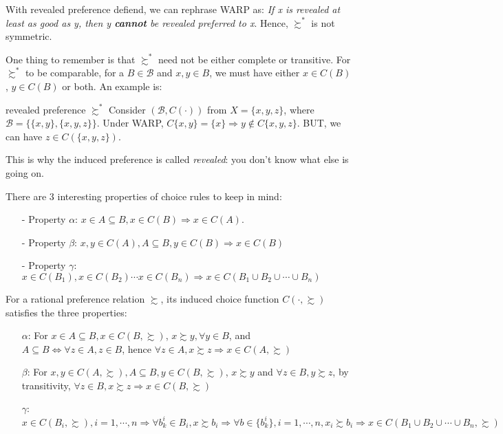 With revealed preference defiend, we can rephrase WARP as: \textit{If x is revealed at least as good as y, then y \textbf{cannot} be revealed preferred to x}. Hence, $\succsim^*$ is not symmetric.

One thing to remember is that $\succsim^*$ need not be either complete or transitive. For $\succsim^*$ to be comparable, for a $B\in\mathcal{B}$ and $x,y\in B$, we must have either $x\in C(B)$, $y\in C(B)$ or both. An example is:
\begin{example}{revealed preference $\succsim^*$}
    Consider $(\mathcal{B},C(\cdot))$ from $X=\{x,y,z\}$, where $\mathcal{B}=\{\{x,y\},\{x,y,z\}\}$. Under WARP, $C\{x,y\}=\{x\}\Rightarrow y\notin C\{x,y,z\}$.
    BUT, we can have $z\in C(\{x,y,z\})$.
\end{example}

This is why the induced preference is called \textit{revealed}: you don't know what else is going on.

There are 3 interesting properties of choice rules to keep in mind:
\begin{enumerate}
    \item[-] Property $\alpha$: $x\in A \subseteq B,x\in C(B)\Rightarrow x\in C(A)$.
    \item[-] Property $\beta$: $x,y\in C(A), A\subseteq B, y\in C(B)\Rightarrow x\in C(B)$
    \item[-] Property $\gamma$: $x\in C(B_1),x\in C(B_2) \cdots x\in C(B_n)\Rightarrow x\in C(B_1\cup B_2\cup\cdots\cup B_n)$
\end{enumerate}

For a rational preference relation $\succsim$, its induced choice function $C(\cdot,\succsim)$ satisfies the three properties:
\begin{enumerate}
    \item[$\alpha$:] For $x\in A \subseteq B,x\in C(B,\succsim)$, $x\succsim y, \forall y\in B$, and $A\subseteq B\Leftrightarrow \forall z\in A,z\in B$, hence $\forall z\in A,x\succsim z\Rightarrow x\in C(A,\succsim)$
    \item[$\beta$:] For $x,y\in C(A,\succsim), A\subseteq B, y\in C(B,\succsim)$, $x\succsim y$ and $\forall z\in B,y\succsim z$, by transitivity, $\forall z\in B, x\succsim z\Rightarrow x\in C(B,\succsim)$
    \item[$\gamma$:] $x\in C(B_i,\succsim),i=1,\cdots,n\Rightarrow \forall b^i_k \in B_i, x\succsim b_i\Rightarrow \forall b\in \{b^i_k\}, i=1,\cdots,n, x_i\succsim b_i\Rightarrow x\in C(B_1\cup B_2\cup\cdots\cup B_n,\succsim)$
\end{enumerate}

